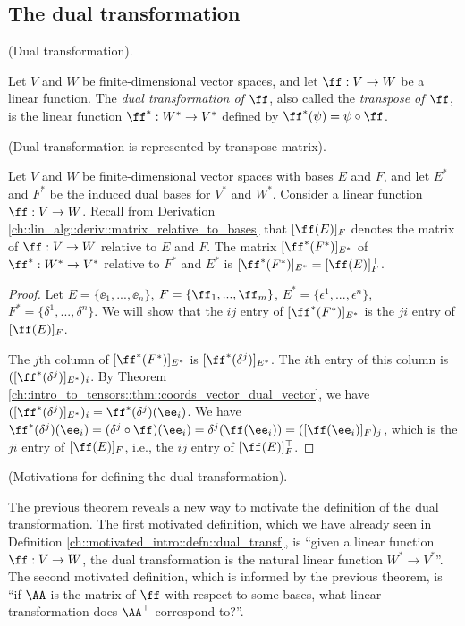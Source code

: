 \subsection*{The dual transformation}

\begin{defn}
\label{ch::motivated_intro::defn::dual_transf}
    (Dual transformation).
    
    Let $V$ and $W$ be finite-dimensional vector spaces, and let $\ff:V \rightarrow W$ be a linear function.
    The \textit{dual transformation of $\ff$}, also called the \textit{transpose of $\ff$}, is the linear function $\ff^*:W^* \rightarrow V^*$ defined by $\ff^*(\psi) = \psi \circ \ff$.
\end{defn}

\begin{theorem}
    (Dual transformation is represented by transpose matrix).

    Let $V$ and $W$ be finite-dimensional vector spaces with bases $E$ and $F$, and let $E^*$ and $F^*$ be the induced dual bases for $V^*$ and $W^*$. Consider a linear function $\ff:V \rightarrow W$. Recall from Derivation \ref{ch::lin_alg::deriv::matrix_relative_to_bases} that $[\ff(E)]_F$ denotes the matrix of $\ff:V \rightarrow W$ relative to $E$ and $F$. The matrix $[\ff^*(F^*)]_{E^*}$ of $\ff^*:W^* \rightarrow V^*$ relative to $F^*$ and $E^*$ is $[\ff^*(F^*)]_{E^*} = [\ff(E)]_F^{\top}$.
\end{theorem}

\begin{proof}
    Let $E = \{\ee_1, ..., \ee_n\}$, $F = \{\ff_1, ..., \ff_m\}$, $E^* = \{\epsilon^1, ..., \epsilon^n\}$, $F^* = \{\delta^1, ..., \delta^n\}$. We will show that the $ij$ entry of $[\ff^*(F^*)]_{E^*}$ is the $ji$ entry of $[\ff(E)]_F$.
    
    The $j$th column of $[\ff^*(F^*)]_{E^*}$ is $[\ff^*(\delta^j)]_{E^*}$. The $i$th entry of this column is $([\ff^*(\delta^j)]_{E^*})_i$. By Theorem \ref{ch::intro_to_tensors::thm::coords_vector_dual_vector}, we have $([\ff^*(\delta^j)]_{E^*})_i = \ff^*(\delta^j)(\ee_i)$. We have $\ff^*(\delta^j)(\ee_i) = (\delta^j \circ \ff)(\ee_i) = \delta^j(\ff(\ee_i)) = ([\ff(\ee_i)]_F)_j$, which is the $ji$ entry of $[\ff(E)]_F$, i.e., the $ij$ entry of $[\ff(E)]_F^\top$.
\end{proof}

\begin{remark}
    (Motivations for defining the dual transformation).
    
    The previous theorem reveals a new way to motivate the definition of the dual transformation. The first motivated definition, which we have already seen in Definition \ref{ch::motivated_intro::defn::dual_transf}, is ``given a linear function $\ff:V \rightarrow W$, the dual transformation is the natural linear function $W^* \rightarrow V^*$''. The second motivated definition, which is informed by the previous theorem, is ``if $\AA$ is the matrix of $\ff$ with respect to some bases, what linear transformation does $\AA^\top$ correspond to?''.
\end{remark}

